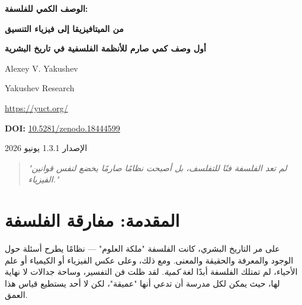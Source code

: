 \documentclass[11pt,a4paper]{article}
\begin{document}
	
	\begin{titlepage}
		\begin{center}
			\vspace*{1cm}
			{\Huge\bfseries\color{darkblue} الوصف الكمي للفلسفة:\par}
			\vspace{0.3cm}
			{\Huge\bfseries\color{darkblue} من الميتافيزيقا إلى فيزياء التنسيق\par}
			\vspace{1cm}
			{\Large\bfseries أول وصف كمي صارم للأنظمة الفلسفية في تاريخ البشرية\par}
			\vspace{1.5cm}
			{\large Alexey V. Yakushev\par}
			{\large Yakushev Research\par}
			{\large \url{https://yuct.org/}\par}
			\vspace{1cm}
			{\large \textbf{DOI:} \href{https://doi.org/10.5281/zenodo.18444599}{10.5281/zenodo.18444599}\par}
			\vspace{1cm}
			{\large الإصدار 1.3.1 \quad يونيو 2026\par}
			\vfill
			\begin{quote}
				\itshape
				"لم تعد الفلسفة فنًا للتفلسف، بل أصبحت نظامًا صارمًا يخضع لنفس قوانين الفيزياء."
			\end{quote}
		\end{center}
	\end{titlepage}
	
	\tableofcontents
	\newpage
	
	\section{المقدمة: مفارقة الفلسفة}
	
	على مر التاريخ البشري، كانت الفلسفة "ملكة العلوم" — نظامًا يطرح أسئلة حول الوجود والمعرفة والحقيقة والمعنى. ومع ذلك، وعلى عكس الفيزياء أو الكيمياء أو علم الأحياء، لم تمتلك الفلسفة أبدًا لغة \emph{كمية}. لقد ظلت فن التفسير، وساحة جدالات لا نهاية لها، حيث يمكن لكل مدرسة أن تدعي أنها "عميقة"، لكن لا أحد يستطيع قياس هذا العمق.
	
\end{document}
